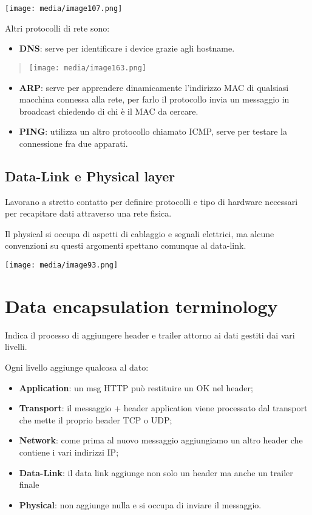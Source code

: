 \texttt{[image: media/image107.png]}

Altri protocolli di rete sono:

\begin{itemize}
\item
  \textbf{DNS}: serve per identificare i device grazie agli hostname.
\end{itemize}

\begin{quote}
\texttt{[image: media/image163.png]}
\end{quote}

\begin{itemize}
\item
  \textbf{ARP}: serve per apprendere dinamicamente l'indirizzo MAC di
  qualsiasi macchina connessa alla rete, per farlo il protocollo invia
  un messaggio in broadcast chiedendo di chi è il MAC da cercare.
\item
  \textbf{PING}: utilizza un altro protocollo chiamato ICMP, serve per
  testare la connessione fra due apparati.
\end{itemize}

\subsection{Data-Link e Physical
layer}\label{data-link-e-physical-layer}

Lavorano a stretto contatto per definire protocolli e tipo di hardware
necessari per recapitare dati attraverso una rete fisica.

Il physical si occupa di aspetti di cablaggio e segnali elettrici, ma
alcune convenzioni su questi argomenti spettano comunque al data-link.

\texttt{[image: media/image93.png]}

\section{Data encapsulation
terminology}\label{data-encapsulation-terminology}

Indica il processo di aggiungere header e trailer attorno ai dati
gestiti dai vari livelli.

Ogni livello aggiunge qualcosa al dato:

\begin{itemize}
\item
  \textbf{Application}: un msg HTTP può restituire un OK nel header;
\item
  \textbf{Transport}: il messaggio + header application viene processato
  dal transport che mette il proprio header TCP o UDP;
\item
  \textbf{Network}: come prima al nuovo messaggio aggiungiamo un altro
  header che contiene i vari indirizzi IP;
\item
  \textbf{Data-Link}: il data link aggiunge non solo un header ma anche
  un trailer finale
\item
  \textbf{Physical}: non aggiunge nulla e si occupa di inviare il
  messaggio.
\end{itemize}

